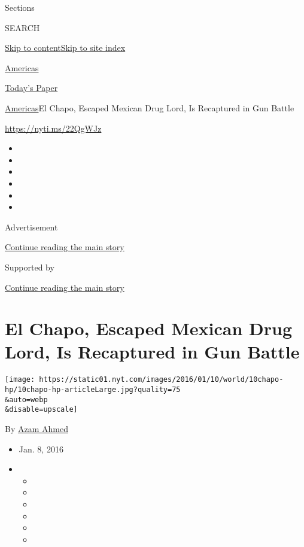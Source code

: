 Sections

SEARCH

\protect\hyperlink{site-content}{Skip to
content}\protect\hyperlink{site-index}{Skip to site index}

\href{https://www.nytimes.com/section/world/americas}{Americas}

\href{https://myaccount.nytimes.com/auth/login?response_type=cookie\&client_id=vi}{}

\href{https://www.nytimes.com/section/todayspaper}{Today's Paper}

\href{/section/world/americas}{Americas}\textbar{}El Chapo, Escaped
Mexican Drug Lord, Is Recaptured in Gun Battle

\url{https://nyti.ms/22QgWJz}

\begin{itemize}
\item
\item
\item
\item
\item
\item
\end{itemize}

Advertisement

\protect\hyperlink{after-top}{Continue reading the main story}

Supported by

\protect\hyperlink{after-sponsor}{Continue reading the main story}

\hypertarget{el-chapo-escaped-mexican-drug-lord-is-recaptured-in-gun-battle}{%
\section{El Chapo, Escaped Mexican Drug Lord, Is Recaptured in Gun
Battle}\label{el-chapo-escaped-mexican-drug-lord-is-recaptured-in-gun-battle}}

\texttt{[image: https://static01.nyt.com/images/2016/01/10/world/10chapo-hp/10chapo-hp-articleLarge.jpg?quality=75\\\&auto=webp\\\&disable=upscale]}

By \href{http://www.nytimes.com/by/azam-ahmed}{Azam Ahmed}

\begin{itemize}
\item
  Jan. 8, 2016
\item
  \begin{itemize}
  \item
  \item
  \item
  \item
  \item
  \item
  \end{itemize}
\end{itemize}


